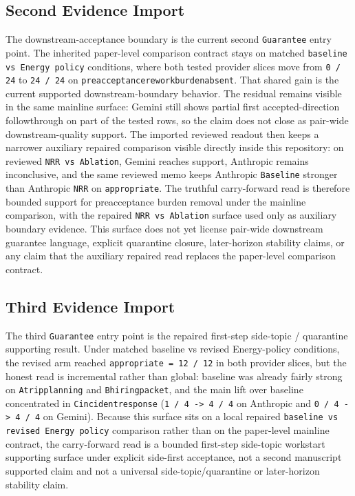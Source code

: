 \documentclass[11pt]{article}
\renewcommand{\_}{\textunderscore\hspace{0pt}}
\begin{document}
\subsection{Second Evidence Import}

The downstream-acceptance boundary is the current second \texttt{Guarantee}
entry point. The inherited paper-level comparison contract stays on matched
\texttt{baseline vs Energy policy} conditions, where both tested provider
slices move from \texttt{0 / 24} to \texttt{24 / 24} on
\texttt{preacceptance\_rework\_burden\_absent}. That shared gain is the current
supported downstream-boundary behavior. The residual remains visible in the
same mainline surface: Gemini still shows partial first accepted-direction
followthrough on part of the tested rows, so the claim does not close as
pair-wide downstream-quality support. The imported reviewed readout then keeps a
narrower auxiliary repaired comparison visible directly inside this repository:
on reviewed \texttt{NRR vs Ablation}, Gemini reaches support, Anthropic remains
inconclusive, and the same reviewed memo keeps Anthropic \texttt{Baseline}
stronger than Anthropic \texttt{NRR} on \texttt{appropriate}. The truthful
carry-forward read is therefore bounded support for preacceptance burden
removal under the mainline comparison, with the repaired \texttt{NRR vs
Ablation} surface used only as auxiliary boundary evidence. This surface does
not yet license pair-wide downstream guarantee language, explicit quarantine
closure, later-horizon stability claims, or any claim that the auxiliary
repaired read replaces the paper-level comparison contract.

\subsection{Third Evidence Import}

The third \texttt{Guarantee} entry point is the repaired first-step side-topic
/ quarantine supporting result. Under matched baseline
vs revised Energy-policy conditions, the revised arm reached
\texttt{appropriate = 12 / 12} in both provider slices, but the honest read is
incremental rather than global: baseline was already fairly strong on
\texttt{A\_trip\_planning} and \texttt{B\_hiring\_packet}, and the main lift
over baseline concentrated in \texttt{C\_incident\_response}
(\texttt{1 / 4 -> 4 / 4} on Anthropic and \texttt{0 / 4 -> 4 / 4} on Gemini).
Because this surface sits on a local repaired
\texttt{baseline vs revised Energy policy} comparison rather than on the
paper-level mainline contract, the carry-forward read is a bounded
first-step side-topic workstart supporting surface under explicit side-first
acceptance, not a second manuscript supported claim and not a universal
side-topic/quarantine or later-horizon stability claim.
\end{document}
